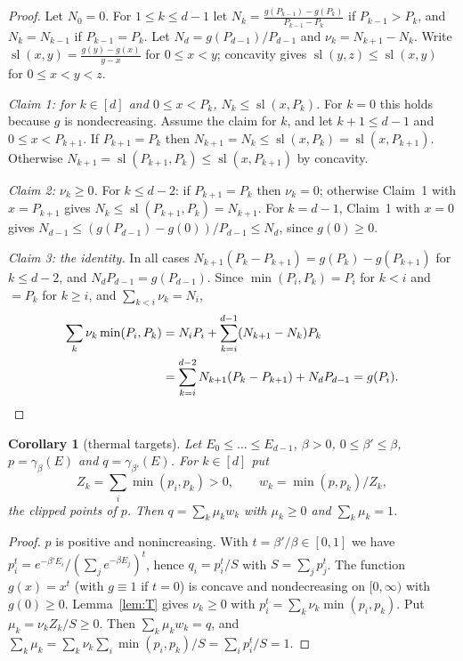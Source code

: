 \documentclass[11pt]{amsart}
\newtheorem{corollary}[lemma]{Corollary}
\theoremstyle{definition}
\theoremstyle{remark}
\numberwithin{equation}{section}
\begin{document}
\begin{proof}
Let $N_0=0$. For $1\le k\le d-1$ let $N_k=\frac{g(P_{k-1})-g(P_k)}{P_{k-1}-P_k}$ if $P_{k-1}>P_k$, and
$N_k=N_{k-1}$ if $P_{k-1}=P_k$. Let $N_d=g(P_{d-1})/P_{d-1}$ and $\nu_k=N_{k+1}-N_k$. Write
$\operatorname{sl}(x,y)=\frac{g(y)-g(x)}{y-x}$ for $0\le x<y$; concavity gives
$\operatorname{sl}(y,z)\le\operatorname{sl}(x,y)$ for $0\le x<y<z$.

\emph{Claim 1: for $k\in[d]$ and $0\le x<P_k$, $N_k\le\operatorname{sl}(x,P_k)$.} For $k=0$ this holds
because $g$ is nondecreasing. Assume the claim for $k$, and let $k+1\le d-1$ and $0\le x<P_{k+1}$. If
$P_{k+1}=P_k$ then
$N_{k+1}=N_k\le\operatorname{sl}(x,P_k)=\operatorname{sl}(x,P_{k+1})$. Otherwise
$N_{k+1}=\operatorname{sl}(P_{k+1},P_k)\le\operatorname{sl}(x,P_{k+1})$ by concavity.

\emph{Claim 2: $\nu_k\ge0$.} For $k\le d-2$: if $P_{k+1}=P_k$ then $\nu_k=0$; otherwise Claim~1 with
$x=P_{k+1}$ gives $N_k\le\operatorname{sl}(P_{k+1},P_k)=N_{k+1}$. For $k=d-1$, Claim~1 with $x=0$ gives
$N_{d-1}\le(g(P_{d-1})-g(0))/P_{d-1}\le N_d$, since $g(0)\ge0$.

\emph{Claim 3: the identity.} In all cases $N_{k+1}(P_k-P_{k+1})=g(P_k)-g(P_{k+1})$ for $k\le d-2$, and
$N_dP_{d-1}=g(P_{d-1})$. Since $\min(P_i,P_k)=P_i$ for $k<i$ and $=P_k$ for $k\ge i$, and
$\sum_{k<i}\nu_k=N_i$,
\begin{align*}
  \sum_k\nu_k\min(P_i,P_k)&=N_iP_i+\sum_{k=i}^{d-1}(N_{k+1}-N_k)P_k\\
  &=\sum_{k=i}^{d-2}N_{k+1}(P_k-P_{k+1})+N_dP_{d-1}=g(P_i) .\qedhere
\end{align*}
\end{proof}

\begin{corollary}[thermal targets]\label{cor:thermal}
Let $E_0\le\dots\le E_{d-1}$, $\beta>0$, $0\le\beta'\le\beta$, $p=\gamma_\beta(E)$ and $q=\gamma_{\beta'}(E)$.
For $k\in[d]$ put
\[
  Z_k=\sum_{i}\min(p_i,p_k)>0,\qquad w_k=\min(p,p_k)/Z_k ,
\]
the \emph{clipped points} of $p$. Then $q=\sum_k\mu_kw_k$ with $\mu_k\ge0$ and $\sum_k\mu_k=1$.
\end{corollary}

\begin{proof}
$p$ is positive and nonincreasing. With $t=\beta'/\beta\in[0,1]$ we have
$p_i^t=e^{-\beta'E_i}/(\sum_je^{-\beta E_j})^t$, hence $q_i=p_i^t/S$ with $S=\sum_jp_j^t$. The function
$g(x)=x^t$ (with $g\equiv1$ if $t=0$) is concave and nondecreasing on $[0,\infty)$ with $g(0)\ge0$.
Lemma~\ref{lem:T} gives $\nu_k\ge0$ with $p_i^t=\sum_k\nu_k\min(p_i,p_k)$. Put $\mu_k=\nu_kZ_k/S\ge0$.
Then $\sum_k\mu_kw_k=q$, and $\sum_k\mu_k=\sum_k\nu_k\sum_i\min(p_i,p_k)/S=\sum_ip_i^t/S=1$.
\end{proof}
\end{document}
